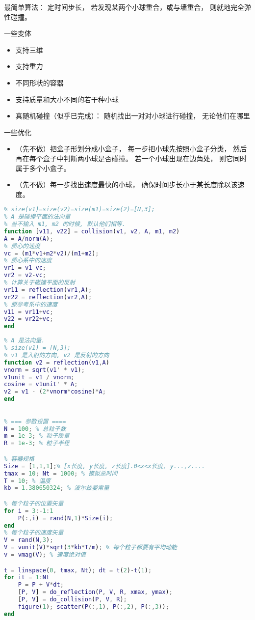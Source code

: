 
\begin{issues}
\issueDraft
\end{issues}


最简单算法： 定时间步长， 若发现某两个小球重合，或与墙重合， 则就地完全弹性碰撞。

一些变体
\begin{itemize}
\item 支持三维
\item 支持重力
\item 不同形状的容器
\item 支持质量和大小不同的若干种小球
\item 真随机碰撞（似乎已完成）： 随机找出一对对小球进行碰撞， 无论他们在哪里
\end{itemize}

一些优化
\begin{itemize}
\item （先不做）把盒子形划分成小盒子， 每一步把小球先按照小盒子分类， 然后再在每个盒子中判断两小球是否碰撞。 若一个小球出现在边角处， 则它同时属于多个小盒子。
\item （先不做）每一步找出速度最快的小球， 确保时间步长小于某长度除以该速度。
\end{itemize}

\begin{lstlisting}[language=matlab]
% 两个粒子的完全弹性碰撞
% size(v1)=size(v2)=size(m1)=size(2)=[N,3];
% A 是碰撞平面的法向量
% 当不输入 m1, m2 的时候, 默认他们相等.
function [v11, v22] = collision(v1, v2, A, m1, m2)
A = A/norm(A);
% 质心的速度
vc = (m1*v1+m2*v2)/(m1+m2);
% 质心系中的速度
vr1 = v1-vc;
vr2 = v2-vc;
% 计算关于碰撞平面的反射
vr11 = reflection(vr1,A);
vr22 = reflection(vr2,A);
% 原参考系中的速度
v11 = vr11+vc;
v22 = vr22+vc;
end
\end{lstlisting}

\begin{lstlisting}[language=matlab]
% 反射
% A 是法向量. 
% size(v1) = [N,3];
% v1 是入射的方向, v2 是反射的方向
function v2 = reflection(v1,A)
vnorm = sqrt(v1' * v1);
v1unit = v1 / vnorm;
cosine = v1unit' * A;
v2 = v1 - (2*vnorm*cosine)*A;
end
\end{lstlisting}

\begin{lstlisting}[language=matlab]
%麦克斯韦-波尔兹曼分布

% === 参数设置 ====
N = 100; % 总粒子数
m = 1e-3; % 粒子质量
R = 1e-3; % 粒子半径

% 容器规格
Size = [1,1,1];% [x长度, y长度, z长度].0<x<x长度, y...,z....
tmax = 10; Nt = 1000; % 模拟总时间
T = 10; % 温度
kb = 1.380650324; % 波尔兹曼常量

% 每个粒子的位置矢量
for i = 3:-1:1
    P(:,i) = rand(N,1)*Size(i);
end
% 每个粒子的速度矢量
V = rand(N,3);
V = vunit(V)*sqrt(3*kb*T/m); % 每个粒子都要有平均动能
v = vmag(V); % 速度绝对值

t = linspace(0, tmax, Nt); dt = t(2)-t(1);
for it = 1:Nt
    P = P + V*dt;
    [P, V] = do_reflection(P, V, R, xmax, ymax);
    [P, V] = do_collision(P, V, R);
    figure(1); scatter(P(:,1), P(:,2), P(:,3));
end
\end{lstlisting}
